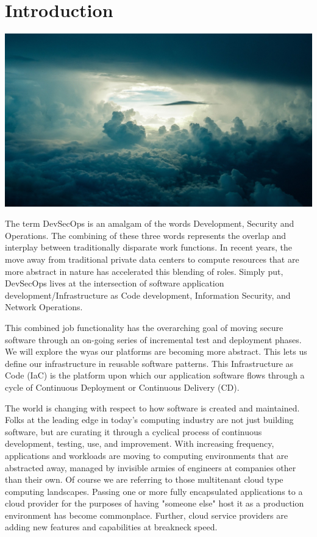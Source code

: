 \chapter{Introduction}

\includegraphics[scale=0.85]{../images/sky-690293_1920.jpg}

\justify
The term DevSecOps is an amalgam of the words
Development, Security and Operations. The combining of these three words
represents the overlap and interplay between traditionally disparate work
functions. In recent years, the move away from traditional private data
centers to compute resources that are more abstract in nature has accelerated 
this blending of roles. Simply put, DevSecOps lives at the intersection of
software application development/Infrastructure as Code development,
Information Security, and Network Operations. 

\justify
This combined job functionality has the overarching goal of moving secure
software through an on-going series of incremental test and deployment
phases. We will explore the wyas our platforms are becoming more abstract. This 
lets us define our infrastructure in reusable software patterns. This 
Infrastructure as Code (IaC) is the platform
upon which our application software flows through a cycle of Continuous 
Deployment or Continuous Delivery (CD). 

\justify
The world is changing with respect to how software is created and maintained. 
Folks at the leading edge in today's computing industry are not just building
software, but are curating it through a cyclical process of continuous development,
testing, use, and improvement. With increasing frequency, applications and
workloads are moving to computing environments that are abstracted away, managed
by invisible armies of engineers at companies other than their own. Of course
we are referring to those multitenant cloud type computing landscapes. Passing
one or more fully encapsulated applications to a cloud provider for the purposes
of having "someone else" host it as a production environment has become
commonplace. Further, cloud service providers are adding new features and capabilities 
at breakneck speed.

